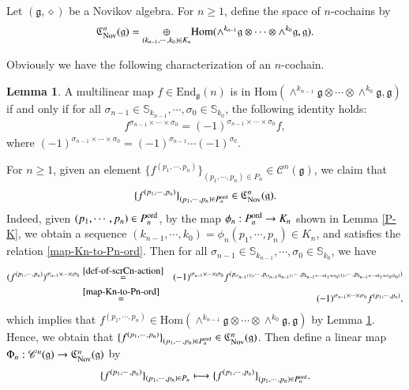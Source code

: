\documentclass[12pt]{amsart}
\theoremstyle{definition}
\newtheorem{lem}[thm]{Lemma}
\newcommand{\g}{\mathfrak g}
\newcommand{\frkC}{\mathfrak C}
\newcommand{\Hom}{\mathrm{Hom}}
\newcommand{\End}{\mathrm{End}}
\newcommand{\ot}{\otimes}
\newcommand{\ord}{{\rm ord}}
\newcommand{\scrC}{{\mathscr{C}}}
\newcommand{\nov}{{\rm Nov}}
\begin{document}
Let $(\g,\diamond)$ be a Novikov algebra. For $n\geq 1$, define the space of $n$-cochains by
\begin{equation}\label{eq:Nov-n-cochain}
\frkC_{\nov}^n(\g)=\underset{(k_{n-1},\cdots,k_0)\in K_n}{\oplus}\Hom(\wedge^{k_{n-1}}\g\ot\cdots\ot\wedge^{k_0}\g,\g).
\end{equation}

Obviously we have the following characterization of an $n$-cochain.

\begin{lem}\label{f-act-direct-product}
A multilinear map $f\in \End_\g(n)$ is in $\Hom(\wedge^{k_{n-1}}\g\ot\cdots\ot\wedge^{k_0}\g,\g)$ if and only if for all $\sigma_{n-1}\in \mathbb{S}_{k_{n-1}},\cdots,\sigma_0\in \mathbb{S}_{k_0}$, the following identity holds:
	\begin{align*}
		f^{\sigma_{n-1}\times\cdots\times\sigma_0}=(-1)^{\sigma_{n-1}\times\cdots\times\sigma_0} f,
	\end{align*}
where $(-1)^{\sigma_{n-1}\times\cdots\times\sigma_0}=(-1)^{\sigma_{n-1}}\cdots(-1)^{\sigma_0}$.
\end{lem}



For $n\geq 1$, given an element $\{f^{(p_1,\cdots,p_n)}\}_{(p_1,\cdots,p_n)\in P_n}\in\scrC^n(\g)$,
we claim that
$$
\{f^{(p_1,\cdots,p_n)}\}_{(p_1,\cdots,p_n)\in P_n^{\ord}}\in\frkC_{\nov}^n(\g).
$$
Indeed, given $(p_1,\cdots,p_n)\in P_n^{\ord}$, by the map $\phi_n:P^\ord_n\to K_n$ shown in Lemma \ref{P-K}, we obtain a sequence
$(k_{n-1},\cdots,k_0)=\phi_n(p_1,\cdots,p_n)\in K_n$,
and satisfies the relation \eqref{map-Kn-to-Pn-ord}.
Then for all $\sigma_{n-1}\in \mathbb{S}_{k_{n-1}},\cdots,\sigma_0\in \mathbb{S}_{k_0}$, we have
\begin{eqnarray*}
	(f^{(p_1,\cdots,p_n)})^{\sigma_{n-1}\times\cdots\times\sigma_0}
	&\overset{\eqref{def-of-scrCn-action}}=&(-1)^{\sigma_{n-1}\times\cdots\times\sigma_0}f^{(p_{\sigma_{n-1}(1)},\cdots,p_{\sigma_{n-1}(k_{n-1})},\cdots,p_{k_{n-1}+\cdots+k_1+\sigma_0({1})},\cdots,p_{k_{n-1}+\cdots+k_1+\sigma_0(k_0)})}\\
	&\overset{\eqref{map-Kn-to-Pn-ord}}=&(-1)^{\sigma_{n-1}\times\cdots\times\sigma_0}f^{(p_1,\cdots,p_n)},
\end{eqnarray*}
which implies that $f^{(p_1,\cdots,p_n)}\in\Hom(\wedge^{k_{n-1}}\g\ot\cdots\ot\wedge^{k_0}\g,\g)$ by Lemma \ref{f-act-direct-product}. Hence, we obtain that $\{f^{(p_1,\cdots,p_n)}\}_{(p_1,\cdots,p_n)\in P_n^{\ord}}\in\frkC_{\nov}^n(\g)$. Then define a linear map $\Phi_n:\scrC^n(\g)\to \frkC^n_{\nov}(\g)$ by
\begin{align}
	\{f^{(p_1,\cdots,p_n)}\}_{(p_1,\cdots,p_n)\in P_n}\longmapsto \{f^{(p_1,\cdots,p_n)}\}_{(p_1,\cdots,p_n)\in P_n^{\ord}}.
\end{align}
\end{document}
